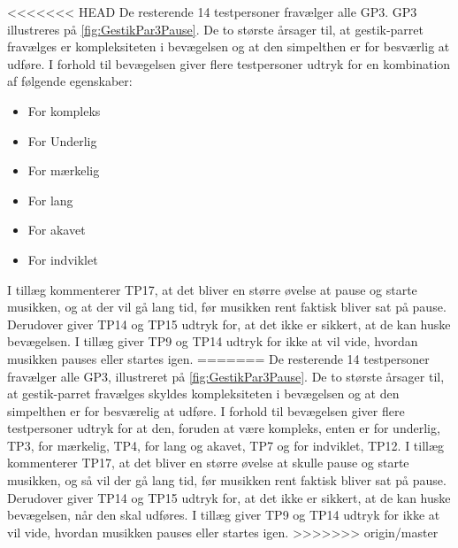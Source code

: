 \noindent
<<<<<<< HEAD
De resterende 14 testpersoner fravælger alle GP3. GP3 illustreres på \autoref{fig:GestikPar3Pause}. De to største årsager til, at gestik-parret fravælges er kompleksiteten i bevægelsen og at den simpelthen er for besværlig at udføre. I forhold til bevægelsen giver flere testpersoner udtryk for en kombination af følgende egenskaber:
%
\begin{multicols}{3}
    \begin{itemize}
        \item For kompleks
        \item For Underlig
        \item For mærkelig
        \item For lang
        \item For akavet
        \item For indviklet
\end{itemize}
\end{multicols}
\noindent
%  
I tillæg kommenterer TP17, at det bliver en større øvelse at pause og starte musikken, og at der vil gå lang tid, før musikken rent faktisk bliver sat på pause. Derudover giver TP14 og TP15 udtryk for, at det ikke er sikkert, at de kan huske bevægelsen. I tillæg giver TP9 og TP14 udtryk for ikke at vil vide, hvordan musikken pauses eller startes igen. 
=======
De resterende 14 testpersoner fravælger alle GP3, illustreret på \autoref{fig:GestikPar3Pause}. De to største årsager til, at gestik-parret fravælges skyldes kompleksiteten i bevægelsen og at den simpelthen er for besværelig at udføre. I forhold til bevægelsen giver flere testpersoner udtryk for at den, foruden at være kompleks, enten er for underlig, TP3, for mærkelig, TP4, for lang og akavet, TP7 og for indviklet, TP12. I tillæg kommenterer TP17, at det bliver en større øvelse at skulle pause og starte musikken, og så vil der gå lang tid, før musikken rent faktisk bliver sat på pause. Derudover giver TP14 og TP15 udtryk for, at det ikke er sikkert, at de kan huske bevægelsen, når den skal udføres. I tillæg giver TP9 og TP14 udtryk for ikke at vil vide, hvordan musikken pauses eller startes igen. 
>>>>>>> origin/master

